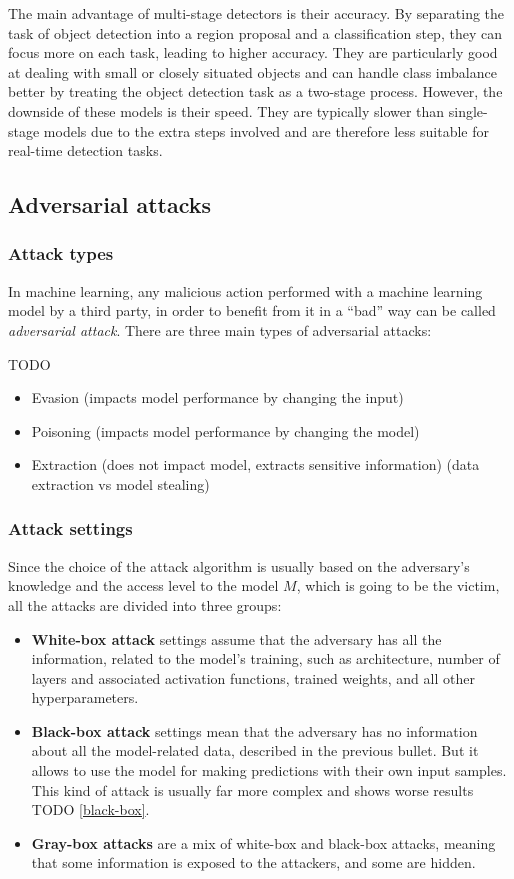 \documentclass[14pt,a4paper]{extarticle}
\newcounter{e}
\newcounter{pic}
\newcounter{tabl}
\numberwithin{equation}{section}
\numberwithin{figure}{section}
\begin{document}
The main advantage of multi-stage detectors is their accuracy. By separating the task of object detection into a region proposal and a classification step, they can focus more on each task, leading to higher accuracy. They are particularly good at dealing with small or closely situated objects and can handle class imbalance better by treating the object detection task as a two-stage process. However, the downside of these models is their speed. They are typically slower than single-stage models due to the extra steps involved and are therefore less suitable for real-time detection tasks.





\subsection{Adversarial attacks}
\subsubsection{Attack types}
In machine learning, any malicious action performed with a machine learning model by a third party, in order to benefit from it in a ``bad'' way can be called \textit{adversarial attack}.
There are three main types of adversarial attacks:


TODO
\begin{itemize}
    \item Evasion (impacts model performance by changing the input)
    \item Poisoning (impacts model performance by changing the model)
    \item Extraction (does not impact model, extracts sensitive information) (data extraction vs model stealing)
\end{itemize}

\subsubsection{Attack settings}
Since the choice of the attack algorithm is usually based on the adversary’s knowledge and the access level to the model $M$, which is going to be the victim, all the attacks are divided into three groups:
\begin{itemize}
    \item \textbf{White-box attack} settings assume that the adversary has all the information, related to the model’s training, such as architecture, number of layers and associated activation functions, trained weights, and all other \newline
    hyperparameters.
    \item \textbf{Black-box attack} settings mean that the adversary has no information about all the model-related data, described in the previous bullet. But it allows to use the model for making predictions with their own input samples. This kind of attack is usually far more complex and shows worse results TODO \ref{black-box}.
    \item \textbf{Gray-box attacks} are a mix of white-box and black-box attacks, meaning that some information is exposed to the attackers, and some are hidden.
\end{itemize}
\end{document}
